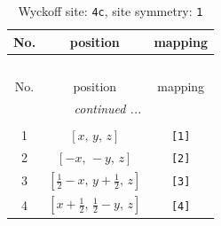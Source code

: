 \documentclass[fleqn,8pt]{jsarticle}
\begin{document}
\begin{longtable}{ccc}
\caption{Wyckoff site: {\tt 4c}, site symmetry: {\tt 1}}
 \\
 \hline \hline
No. & position & mapping \\ \hline \endfirsthead

\multicolumn{2}{l}{\tablename\ \thetable{}} \\
 \hline \hline
No. & position & mapping \\ \hline \endhead

 \hline \hline
\multicolumn{2}{r}{\footnotesize\it continued ...} \\ \endfoot

 \hline \hline
\multicolumn{2}{r}{} \\ \endlastfoot

1 & $\left[ x,\, y,\, z \right]$ & {\tt [1]} \\ \hline
2 & $\left[ - x,\, - y,\, z \right]$ & {\tt [2]} \\ \hline
3 & $\left[ \frac{1}{2} - x,\, y + \frac{1}{2},\, z \right]$ & {\tt [3]} \\ \hline
4 & $\left[ x + \frac{1}{2},\, \frac{1}{2} - y,\, z \right]$ & {\tt [4]} \\
\end{longtable}
\end{document}

